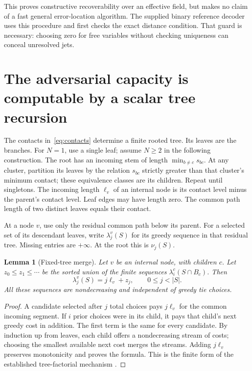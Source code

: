 \documentclass[11pt]{article}
\newtheorem{lemma}[theorem]{Lemma}
\theoremstyle{definition}
\begin{document}
This proves constructive recoverability over an effective field, but makes no claim of a fast general error-location algorithm. The supplied binary reference decoder uses this procedure and first checks the exact distance condition. That guard is necessary: choosing zero for free variables without checking uniqueness can conceal unresolved jets.

\section{The adversarial capacity is computable by a scalar tree recursion}\label{sec:dp}

The contacts in~\eqref{eq:contacts} determine a finite rooted tree. Its leaves are the branches. For $N=1$, use a single leaf; assume $N\ge2$ in the following construction. The root has an incoming stem of length $\min_{b\ne c}s_{bc}$. At any cluster, partition its leaves by the relation $s_{bc}$ strictly greater than that cluster's minimum contact; these equivalence classes are its children. Repeat until singletons. The incoming length $\ell_v$ of an internal node is its contact level minus the parent's contact level. Leaf edges may have length zero. The common path length of two distinct leaves equals their contact.

At a node $v$, use only the residual common path below its parent. For a selected set of its descendant leaves, write $\lambda_j^v(S)$ for its greedy sequence in that residual tree. Missing entries are $+\infty$. At the root this is $\nu_j(S)$.

\begin{lemma}[Fixed-tree merge]\label{lem:merge}
Let $v$ be an internal node, with children $c$. Let $z_0\le z_1\le\cdots$ be the sorted union of the finite sequences $\lambda_i^c(S\cap B_c)$. Then
\begin{equation}\label{eq:merge}
 \lambda_j^v(S)=j\ell_v+z_j,\qquad 0\le j<|S|.
\end{equation}
All these sequences are nondecreasing and independent of greedy tie choices.
\end{lemma}

\begin{proof}
A candidate selected after $j$ total choices pays $j\ell_v$ for the common incoming segment. If $i$ prior choices were in its child, it pays that child's next greedy cost in addition. The first term is the same for every candidate. By induction up from leaves, each child offers a nondecreasing stream of costs; choosing the smallest available next cost merges the streams. Adding $j\ell_v$ preserves monotonicity and proves the formula. This is the finite form of the established tree-factorial mechanism \cite{amini}.
\end{proof}
\end{document}
